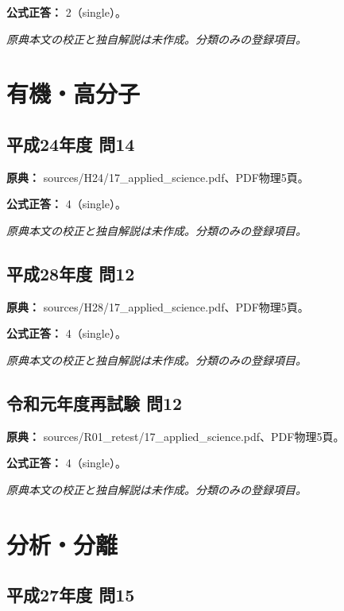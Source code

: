 \textbf{公式正答：} 2（single）。

\par\textit{原典本文の校正と独自解説は未作成。分類のみの登録項目。}

\section{有機・高分子}

\subsection{平成24年度 問14}
\label{q:h24-reg-applied-14}

\noindent\textbf{原典：} sources/H24/17\_applied\_science.pdf、PDF物理5頁。

\textbf{公式正答：} 4（single）。

\par\textit{原典本文の校正と独自解説は未作成。分類のみの登録項目。}

\subsection{平成28年度 問12}
\label{q:h28-reg-applied-12}

\noindent\textbf{原典：} sources/H28/17\_applied\_science.pdf、PDF物理5頁。

\textbf{公式正答：} 4（single）。

\par\textit{原典本文の校正と独自解説は未作成。分類のみの登録項目。}

\subsection{令和元年度再試験 問12}
\label{q:r01-ret-applied-12}

\noindent\textbf{原典：} sources/R01\_retest/17\_applied\_science.pdf、PDF物理5頁。

\textbf{公式正答：} 4（single）。

\par\textit{原典本文の校正と独自解説は未作成。分類のみの登録項目。}

\section{分析・分離}

\subsection{平成27年度 問15}
\label{q:h27-reg-applied-15}

